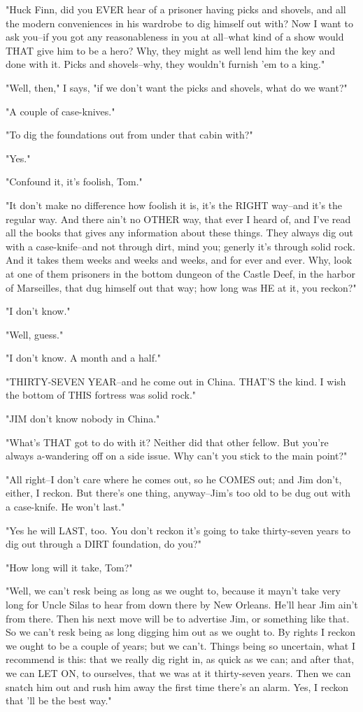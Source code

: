 "Huck Finn, did you EVER hear of a prisoner having picks and shovels, and
all the modern conveniences in his wardrobe to dig himself out with?  Now
I want to ask you--if you got any reasonableness in you at all--what kind
of a show would THAT give him to be a hero?  Why, they might as well lend
him the key and done with it.  Picks and shovels--why, they wouldn't
furnish 'em to a king."

"Well, then," I says, "if we don't want the picks and shovels, what do we
want?"

"A couple of case-knives."

"To dig the foundations out from under that cabin with?"

"Yes."

"Confound it, it's foolish, Tom."

"It don't make no difference how foolish it is, it's the RIGHT way--and
it's the regular way.  And there ain't no OTHER way, that ever I heard
of, and I've read all the books that gives any information about these
things. They always dig out with a case-knife--and not through dirt, mind
you; generly it's through solid rock.  And it takes them weeks and weeks
and weeks, and for ever and ever.  Why, look at one of them prisoners in
the bottom dungeon of the Castle Deef, in the harbor of Marseilles, that
dug himself out that way; how long was HE at it, you reckon?"

"I don't know."

"Well, guess."

"I don't know.  A month and a half."

"THIRTY-SEVEN YEAR--and he come out in China.  THAT'S the kind.  I wish
the bottom of THIS fortress was solid rock."

"JIM don't know nobody in China."

"What's THAT got to do with it?  Neither did that other fellow.  But
you're always a-wandering off on a side issue.  Why can't you stick to
the main point?"

"All right--I don't care where he comes out, so he COMES out; and Jim
don't, either, I reckon.  But there's one thing, anyway--Jim's too old to
be dug out with a case-knife.  He won't last."

"Yes he will LAST, too.  You don't reckon it's going to take thirty-seven
years to dig out through a DIRT foundation, do you?"

"How long will it take, Tom?"

"Well, we can't resk being as long as we ought to, because it mayn't take
very long for Uncle Silas to hear from down there by New Orleans.  He'll
hear Jim ain't from there.  Then his next move will be to advertise Jim,
or something like that.  So we can't resk being as long digging him out
as we ought to.  By rights I reckon we ought to be a couple of years; but
we can't.  Things being so uncertain, what I recommend is this:  that we
really dig right in, as quick as we can; and after that, we can LET ON,
to ourselves, that we was at it thirty-seven years.  Then we can snatch
him out and rush him away the first time there's an alarm.  Yes, I reckon
that 'll be the best way."

